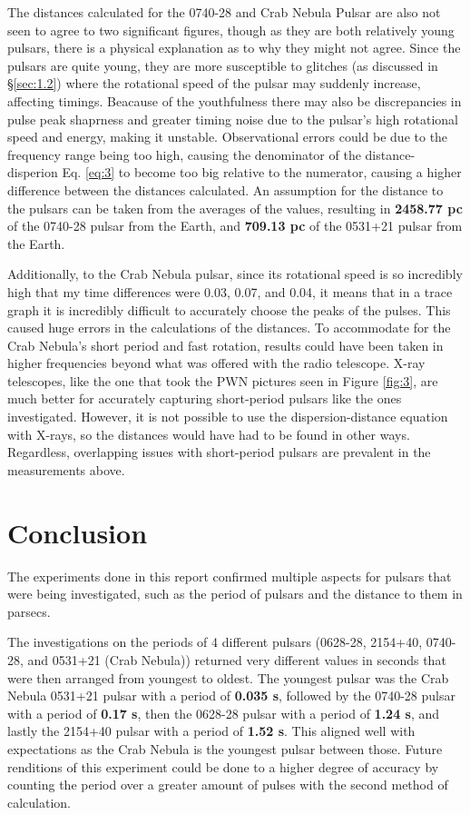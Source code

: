 \documentclass[12pt]{article}
\begin{document}
The distances calculated for the 0740-28 and Crab Nebula Pulsar are also not seen to agree to two significant figures, though as they are both relatively young pulsars, there is a physical explanation as to why they might not agree.
Since the pulsars are quite young, they are more susceptible to glitches (as discussed in §\ref{sec:1.2}) where the rotational speed of the pulsar may suddenly increase, affecting timings. Beacause of the youthfulness there may also be discrepancies in pulse peak shaprness and greater timing noise due
to the pulsar's high rotational speed and energy, making it unstable. Observational errors could be due to the frequency range being too high, causing the denominator of the distance-disperion Eq. \ref{eq:3} to become too big relative to the numerator, causing a higher difference between the distances calculated.
An assumption for the distance to the pulsars can be taken from the averages of the values, resulting in \textbf{2458.77 pc} of the 0740-28 pulsar from the Earth, and \textbf{709.13 pc} of the 0531+21 pulsar from the Earth.

Additionally, to the Crab Nebula pulsar, since its rotational speed is so incredibly high that my time differences were 0.03, 0.07, and 0.04, it means that in a trace graph it is incredibly difficult to accurately choose the peaks of the pulses. This caused huge errors in the calculations of the distances.
To accommodate for the Crab Nebula's short period and fast rotation, results could have been taken in higher frequencies beyond what was offered with the radio telescope. X-ray telescopes, like the one that took the PWN pictures seen in Figure \ref{fig:3}, are much better for accurately capturing short-period pulsars like the ones investigated.
However, it is not possible to use the dispersion-distance equation with X-rays, so the distances would have had to be found in other ways. Regardless, overlapping issues with short-period pulsars are prevalent in the measurements above.

\newpage

\section{Conclusion} \label{sec:4}

The experiments done in this report confirmed multiple aspects for pulsars that were being investigated, such as the period of pulsars and the distance to them in parsecs.

The investigations on the periods of 4 different pulsars (0628-28, 2154+40, 0740-28, and 0531+21 (Crab Nebula)) returned very different values in seconds that were then arranged from youngest to oldest.
The youngest pulsar was the Crab Nebula 0531+21 pulsar with a period of \textbf{0.035 s}, followed by the 0740-28 pulsar with a period of \textbf{0.17 s}, then the 0628-28 pulsar with a period of \textbf{1.24 s}, and lastly the 2154+40 pulsar with a period of \textbf{1.52 s}.
This aligned well with expectations as the Crab Nebula is the youngest pulsar between those. Future renditions of this experiment could be done to a higher degree of accuracy by counting the period over a greater amount of pulses with the second method of calculation.
\end{document}
